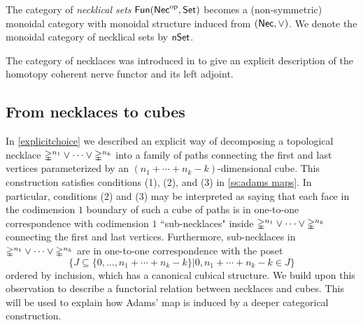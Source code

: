 The category of \textit{necklical sets} $\mathsf{Fun}(\mathsf{Nec}^{\mathrm{op}}, \mathsf{Set})$ becomes a (non-symmetric) monoidal category with monoidal structure induced from $(\mathsf{Nec}, \vee)$.
We denote the monoidal category of necklical sets by $\mathsf{nSet}$.

\begin{remark*}
	The category of necklaces was introduced in \cite{dugger2011rigidification} to give an explicit description of the homotopy coherent nerve functor and its left adjoint.
\end{remark*}



\subsection{From necklaces to cubes}
In \cref{explicitchoice} we described an explicit way of decomposing a topological necklace $\mathbb{\Delta}^{n_1} \vee \cdots \vee \mathbb{\Delta}^{n_k}$ into a family of paths connecting the first and last vertices parameterized by an $(n_1 + \cdots + n_k-k)$-dimensional cube. This construction satisfies conditions (1), (2), and (3) in \cref{ss:adams maps}. In particular, conditions (2) and (3) may be interpreted as saying that each face in the codimension $1$ boundary of such a cube of paths is in one-to-one correspondence with codimension $1$ ``sub-necklaces" inside $\mathbb{\Delta}^{n_1} \vee \cdots \vee \mathbb{\Delta}^{n_k}$ connecting the first and last vertices. Furthermore, sub-necklaces in $\mathbb{\Delta}^{n_1} \vee \cdots \vee \mathbb{\Delta}^{n_k}$ are in one-to-one correspondence with the poset \[\{ J \subseteq \{0,\ldots, n_1+ \cdots + n_k-k\} | 0,n_1+ \cdots +n_k-k \in J \}\]
ordered by inclusion, which has a canonical cubical structure. We build upon this observation to describe a functorial relation between necklaces and cubes. This will be used to explain how Adams' map is induced by a deeper categorical construction.


